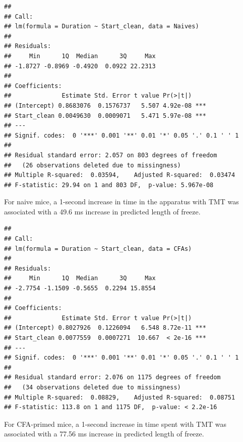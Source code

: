 \documentclass[
]{book}
\newenvironment{Shaded}{\begin{snugshade}}{\end{snugshade}}
\newcommand{\AttributeTok}[1]{\textcolor[rgb]{0.13,0.29,0.53}{#1}}
\newcommand{\FunctionTok}[1]{\textcolor[rgb]{0.13,0.29,0.53}{\textbf{#1}}}
\newcommand{\NormalTok}[1]{#1}
\newcommand{\OtherTok}[1]{\textcolor[rgb]{0.56,0.35,0.01}{#1}}
\newcommand{\SpecialCharTok}[1]{\textcolor[rgb]{0.81,0.36,0.00}{\textbf{#1}}}
\newcommand{\StringTok}[1]{\textcolor[rgb]{0.31,0.60,0.02}{#1}}
\begin{document}
\begin{verbatim}
## 
## Call:
## lm(formula = Duration ~ Start_clean, data = Naives)
## 
## Residuals:
##     Min      1Q  Median      3Q     Max 
## -1.8727 -0.8969 -0.4920  0.0922 22.2313 
## 
## Coefficients:
##              Estimate Std. Error t value Pr(>|t|)    
## (Intercept) 0.8683076  0.1576737   5.507 4.92e-08 ***
## Start_clean 0.0049630  0.0009071   5.471 5.97e-08 ***
## ---
## Signif. codes:  0 '***' 0.001 '**' 0.01 '*' 0.05 '.' 0.1 ' ' 1
## 
## Residual standard error: 2.057 on 803 degrees of freedom
##   (26 observations deleted due to missingness)
## Multiple R-squared:  0.03594,    Adjusted R-squared:  0.03474 
## F-statistic: 29.94 on 1 and 803 DF,  p-value: 5.967e-08
\end{verbatim}

For naive mice, a 1-second increase in time in the apparatus with TMT was associated with a 49.6 ms increase in predicted length of freeze.

\begin{Shaded}
\end{Shaded}

\begin{verbatim}
## 
## Call:
## lm(formula = Duration ~ Start_clean, data = CFAs)
## 
## Residuals:
##     Min      1Q  Median      3Q     Max 
## -2.7754 -1.1509 -0.5655  0.2294 15.8554 
## 
## Coefficients:
##              Estimate Std. Error t value Pr(>|t|)    
## (Intercept) 0.8027926  0.1226094   6.548 8.72e-11 ***
## Start_clean 0.0077559  0.0007271  10.667  < 2e-16 ***
## ---
## Signif. codes:  0 '***' 0.001 '**' 0.01 '*' 0.05 '.' 0.1 ' ' 1
## 
## Residual standard error: 2.076 on 1175 degrees of freedom
##   (34 observations deleted due to missingness)
## Multiple R-squared:  0.08829,    Adjusted R-squared:  0.08751 
## F-statistic: 113.8 on 1 and 1175 DF,  p-value: < 2.2e-16
\end{verbatim}

For CFA-primed mice, a 1-second increase in time spent with TMT was associated with a 77.56 ms increase in predicted length of freeze.
\end{document}
